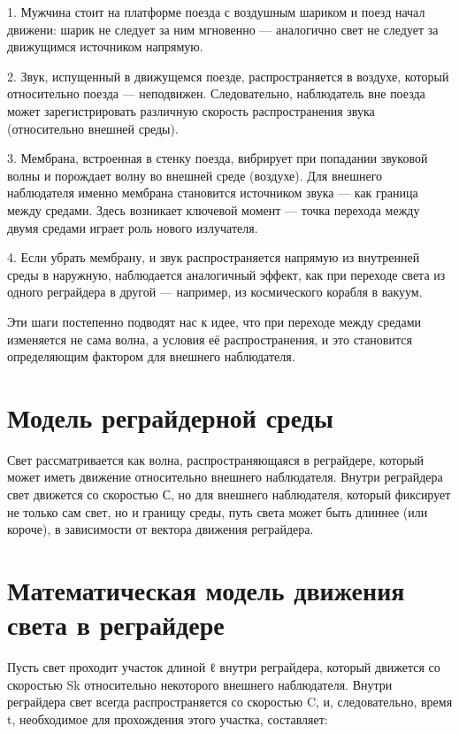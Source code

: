\documentclass[12pt]{article}
\begin{document}
\par
1. Мужчина стоит на платформе поезда с воздушным шариком и поезд начал движени: шарик не следует за ним мгновенно — аналогично свет не следует за движущимся источником напрямую.
\par
2. Звук, испущенный в движущемся поезде, распространяется в воздухе, который относительно поезда — неподвижен. Следовательно, наблюдатель вне поезда может зарегистрировать различную скорость распространения звука (относительно внешней среды).
\par
3. Мембрана, встроенная в стенку поезда, вибрирует при попадании звуковой волны и порождает волну во внешней среде (воздухе). Для внешнего наблюдателя именно мембрана становится источником звука — как граница между средами. Здесь возникает ключевой момент — точка перехода между двумя средами играет роль нового излучателя.
\par
4. Если убрать мембрану, и звук распространяется напрямую из внутренней среды в наружную, наблюдается аналогичный эффект, как при переходе света из одного реграйдера в другой — например, из космического корабля в вакуум.
\par
Эти шаги постепенно подводят нас к идее, что при переходе между средами изменяется не сама волна, а условия её распространения, и это становится определяющим фактором для внешнего наблюдателя.


\section*{Модель реграйдерной среды}

Свет рассматривается как волна, распространяющаяся в реграйдере, который может иметь движение относительно внешнего наблюдателя. Внутри реграйдера свет движется со скоростью С, но для внешнего наблюдателя, который фиксирует не только сам свет, но и границу среды, путь света может быть длиннее (или короче), в зависимости от вектора движения реграйдера.

\section*{Математическая модель движения света в реграйдере}

Пусть свет проходит участок длиной ℓ внутри реграйдера, который движется со скоростью Sk относительно некоторого внешнего наблюдателя. Внутри реграйдера свет всегда распространяется со скоростью C, и, следовательно, время t, необходимое для прохождения этого участка, составляет:
\end{document}

